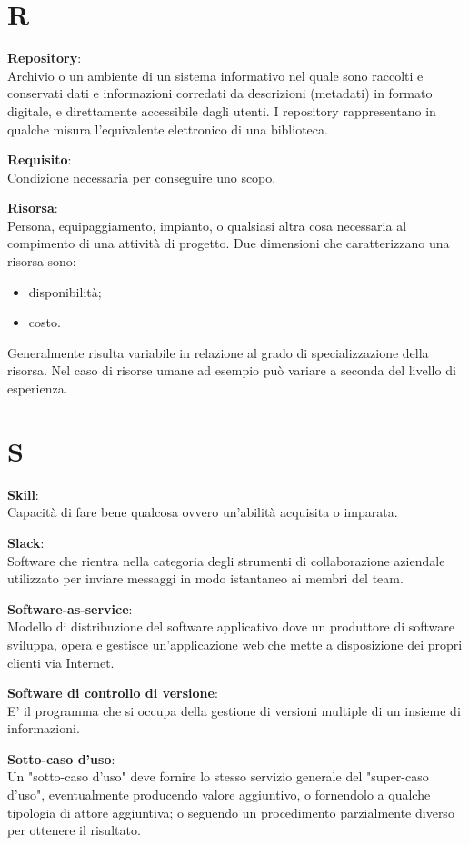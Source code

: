 \documentclass[a4paper, oneside, openany, dvipsnames, table]{article}
\begin{document}
\newpage
\section{R}
\textbf{Repository}:\\	Archivio o un ambiente di un sistema informativo nel quale sono raccolti e conservati dati e informazioni corredati da descrizioni (metadati) in formato digitale, e direttamente accessibile dagli utenti. I repository rappresentano in qualche misura l’equivalente elettronico di una biblioteca.

\textbf{Requisito}:\\	Condizione necessaria per conseguire uno scopo.

\textbf{Risorsa}:\\	Persona, equipaggiamento, impianto, o qualsiasi altra cosa necessaria al compimento di una attività di progetto. Due dimensioni che caratterizzano una risorsa sono:
\begin{itemize}
\item disponibilità;
\item costo.
\end{itemize} 
Generalmente risulta variabile in relazione al grado di specializzazione della risorsa. Nel caso di risorse umane ad esempio può variare a seconda del livello di esperienza.


\newpage
\section{S}
\textbf{Skill}:\\	Capacità di fare bene qualcosa ovvero un'abilità acquisita o imparata.

\textbf{Slack}:\\	Software che rientra nella categoria degli strumenti di collaborazione aziendale utilizzato per inviare messaggi in modo istantaneo ai membri del team.

\textbf{Software-as-service}:\\	Modello di distribuzione del software applicativo dove un produttore di software sviluppa, opera e gestisce un'applicazione web che mette a disposizione dei propri clienti via Internet.

\textbf{Software di controllo di versione}:\\ E' il programma che si occupa della  gestione di versioni multiple di un insieme di informazioni.

\textbf{Sotto-caso d'uso}:\\
Un "sotto-caso d'uso" deve fornire lo stesso servizio generale del "super-caso d'uso", eventualmente producendo valore aggiuntivo, o fornendolo a qualche tipologia di attore aggiuntiva; o seguendo un procedimento parzialmente diverso per ottenere il risultato.
\end{document}
